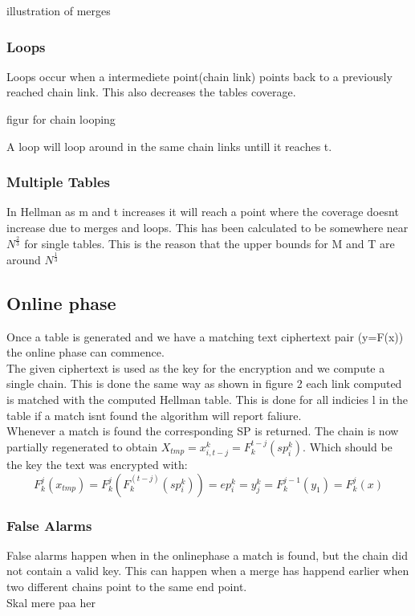 illustration of merges
\subsubsection{Loops}
Loops occur when a intermediete point(chain link) points back to a previously reached chain link. This also decreases the tables coverage.

figur for chain looping

A loop will loop around in the same chain links untill it reaches t.

\subsubsection {Multiple Tables}
In Hellman as m and t increases it will reach a point where the coverage doesnt increase due to merges and loops. This has been calculated to be somewhere near $N^{\frac{2}{3}}$ for single tables. This is the reason that the upper bounds for M and T are around $N^\frac{1}{3}$

\subsection*{Online phase}
Once a table is generated and we have a matching text ciphertext pair (y=F(x)) the online phase can commence.\\
The given ciphertext is used as the key for the encryption and we compute a single chain. This is done the same way as shown in figure 2 each link computed is matched with the computed Hellman table. This is done for all indicies l in the table if a match isnt found the algorithm will report faliure.\\

Whenever a match is found the corresponding SP is returned. The chain is now partially regenerated to obtain $X_{tmp}=x^k_{i,t-j}=F^{t-j}_k(sp^k_i)$. Which should be the key the text was encrypted with:
\begin{equation}
    F^j_k(x_{tmp})=F^j_k(F^(t-j)_k(sp^k_i))=ep^k_i=y^k_j=F^{j-1}_k(y_1)=F^j_k(x)
\end{equation}
\subsubsection{False Alarms}
False alarms happen when in the onlinephase a match is found, but the chain did not contain a valid key. This can happen when a merge has happend earlier when two different chains point to the same end point.
\\
Skal mere paa her
